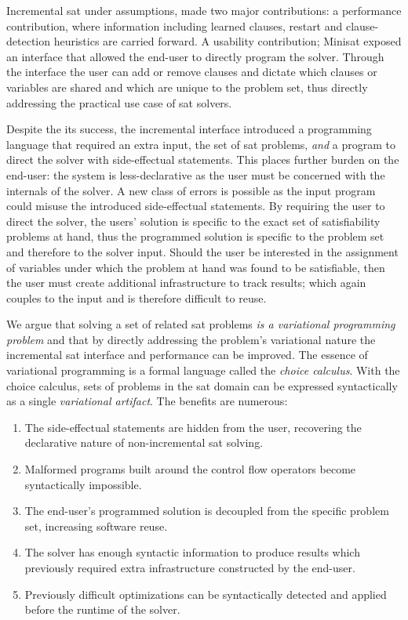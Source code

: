 Incremental \ac{sat} under assumptions, made two major contributions: a
performance contribution, where information including learned clauses, restart
and clause-detection heuristics are carried forward. A usability contribution;
Minisat exposed an interface that allowed the end-user to directly program the
solver. Through the interface the user can add or remove clauses and dictate
which clauses or variables are shared and which are unique to the problem set,
thus directly addressing the practical use case of \ac{sat} solvers.

Despite the its success, the incremental interface introduced a programming
language that required an extra input, the set of \ac{sat} problems, \emph{and}
a program to direct the solver with side-effectual statements. This places
further burden on the end-user: the system is less-declarative as the user must
be concerned with the internals of the solver. A new class of errors is possible
as the input program could misuse the introduced side-effectual statements. By
requiring the user to direct the solver, the users' solution is specific to the
exact set of satisfiability problems at hand, thus the programmed solution is
specific to the problem set and therefore to the solver input. Should the user
be interested in the assignment of variables under which the problem at hand was
found to be satisfiable, then the user must create additional infrastructure to
track results; which again couples to the input and is therefore difficult to
reuse.

We argue that solving a set of related \ac{sat} problems \emph{is a variational
  programming problem} and that by directly addressing the problem's variational
nature the incremental \ac{sat} interface and performance can be improved. The
essence of variational programming is a formal language called the \emph{choice
  calculus}. With the choice calculus, sets of problems in the \ac{sat} domain
can be expressed syntactically as a single \emph{variational artifact}. The
benefits are numerous:
\begin{enumerate}
\item The side-effectual statements are hidden from the user, recovering the
  declarative nature of non-incremental \ac{sat} solving.
\item Malformed programs built around the control flow operators become
  syntactically impossible.
\item The end-user's programmed solution is decoupled from the specific problem
  set, increasing software reuse.
\item The solver has enough syntactic information to produce results which
  previously required extra infrastructure constructed by the end-user.
\item Previously difficult optimizations can be syntactically detected and
  applied before the runtime of the solver.
\end{enumerate}


